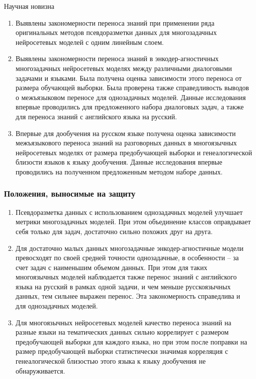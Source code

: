 \begin{frame}{Научная новизна}
\begin{enumerate}
  \item {Выявлены закономерности переноса знаний при применении ряда оригинальных методов псевдоразметки данных для многозадачных нейросетевых моделей с одним линейным слоем.}
  \item {Выявлены закономерности переноса знаний в энкодер-агностичных многозадачных нейросетевых моделях между различными диалоговыми задачами и языками. Была получена оценка зависимости этого переноса от размера обучающей выборки. Была проверена также справедливость выводов о межъязыковом переносе для однозадачных моделей. Данные исследования впервые проводились для предложенного набора диалоговых задач, а также для переноса знаний с английского языка на русский.}
  \item {Впервые для дообучения на русском языке получена оценка зависимости межъязыкового переноса знаний на разговорных данных в многоязычных нейросетевых моделях от размера предобучающей выборки и генеалогической близости языков к языку дообучения. Данные исследования впервые проводились на полученном предложенным методом наборе данных.}
\end{enumerate}    
\end{frame}

\begin{frame}
    \frametitle{Положения, выносимые на защиту}
    \begin{enumerate}
  \item {Псевдоразметка данных с использованием однозадачных моделей улучшает метрики многозадачных моделей. При этом объединение классов оправдывает себя только для задач, достаточно сильно похожих друг на друга.}
  \item {Для достаточно малых данных многозадачные энкодер-агностичные модели превосходят по своей средней точности однозадачные, в особенности -- за счет задач с наименьшим объемом данных. При этом для таких многоязычных моделей наблюдается также перенос знаний с английского языка на русский в рамках одной задачи, и чем меньше русскоязычных данных, тем сильнее выражен перенос. Эта закономерность справедлива и для однозадачных моделей.}
  \item {Для многоязычных нейросетевых моделей качество переноса знаний на разные языки на тематических данных сильно коррелирует с размером предобучающей выборки для каждого языка, но при этом после поправки на размер предобучающей выборки статистически значимая корреляция с генеалогической близостью этого языка к языку дообучения не обнаруживается.}
    \end{enumerate}
\end{frame}

